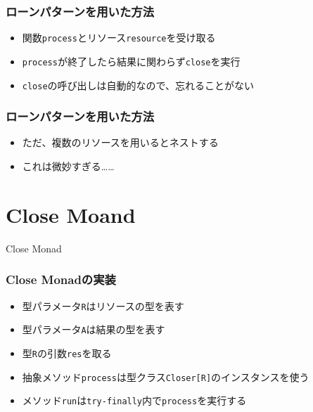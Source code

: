 \begin{frame}
  \frametitle{ローンパターン\cite{loanpattern}を用いた方法}

  
  \begin{itemize}
    \item<3-> 関数\lstinline|process|とリソース\lstinline|resource|を受け取る
    \item<4-> \lstinline|process|が終了したら結果に関わらず\lstinline|close|を実行
    \item<5-> \lstinline|close|の呼び出しは自動的なので、忘れることがない
  \end{itemize}
\end{frame}

\begin{frame}
  \frametitle{ローンパターン\cite{loanpattern}を用いた方法}

  \begin{itemize}
    \item ただ、複数のリソースを用いるとネストする
  \end{itemize}


  \begin{itemize}
    \item<3-> これは微妙すぎる……
  \end{itemize}
\end{frame}

\section{Close Moand}

\begin{frame}
  \centering
  {\Huge Close Monad}
\end{frame}

\begin{frame}
  
\end{frame}

\begin{frame}
  \frametitle{Close Monadの実装}

  

  \begin{itemize}
    \item<2-> 型パラメータ\lstinline|R|はリソースの型を表す
    \item<3-> 型パラメータ\lstinline|A|は結果の型を表す
    \item<4-> 型\lstinline|R|の引数\lstinline|res|を取る
    \item<5-> 抽象メソッド\lstinline|process|は型クラス\lstinline|Closer[R]|のインスタンスを使う
    \item<6-> メソッド\lstinline|run|は\lstinline|try-finally|内で\lstinline|process|を実行する
  \end{itemize}
\end{frame}


